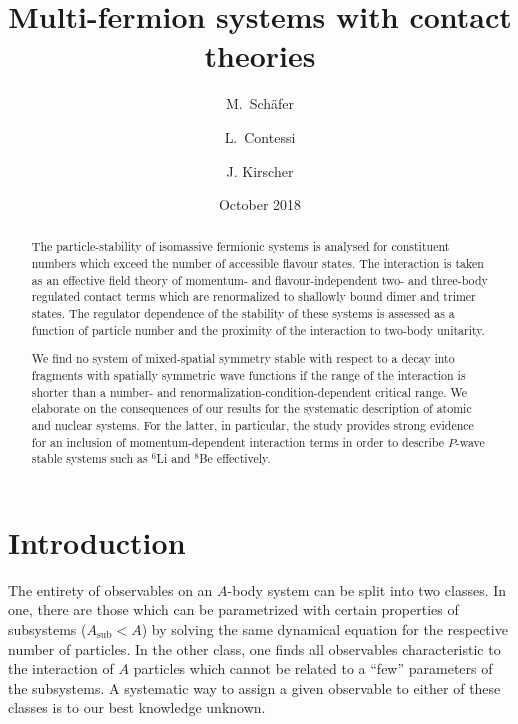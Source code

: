 \documentclass[preprint,12pt]{elsarticle}
\begin{document}
\title{Multi-fermion systems with contact theories}
\author{M.~Sch{\"a}fer}\address{Czech Technical University in Prague, Faculty of Nuclear Sciences 
and Physical Engineering, B\v{r}ehov\'{a} 7, 11519 Prague 1, Czech Republic} 
\author{L.~Contessi} 
\address{Racah Institute of Physics, The Hebrew university, 91904 Jerusalem, 
Israel} 
\address{ESNT, IRFU, CEA, Universite Paris Saclay, F-91191 Gif-sur-Yvette, France} 
\author{J. Kirscher}
\address{Theoretical Physics Division, School of Physics and Astronomy,
The University of Manchester, Manchester, M13 9PL, United Kingdom} 
\date{October 2018}


\begin{abstract}
The particle-stability of isomassive fermionic systems is analysed
for constituent numbers which exceed the number of accessible flavour states. The interaction is taken as an 
effective field theory of momentum- and flavour-independent two- and three-body
regulated contact terms which are renormalized to shallowly bound dimer and trimer states.
The regulator dependence of the stability of these systems is assessed as a function of
particle number and the proximity of the interaction to two-body unitarity.

We find no system of mixed-spatial symmetry stable with respect to
a decay into fragments with spatially symmetric wave functions if the range of the
interaction is shorter than a number- and renormalization-condition-dependent
critical range.
We elaborate on the consequences of our results for the systematic description of
atomic and nuclear systems. For the latter, in particular, the study provides
strong evidence for an inclusion of momentum-dependent interaction terms in order
to describe $P$-wave stable systems such as $^6$Li and $^8$Be effectively.
\end{abstract}

\maketitle

\newpage
\section{Introduction}
The entirety of observables on an $A$-body system can be split into two classes. In one, there are those
which can be parametrized with certain properties of subsystems ($A_\text{sub}<A$) by solving the same
dynamical equation for the respective number of particles. In the other class, one finds all observables
characteristic to the interaction of $A$ particles which cannot be related to a ``few'' parameters of the
subsystems. A systematic way to assign a given observable to either of these classes is to our best knowledge unknown.
\end{document}
